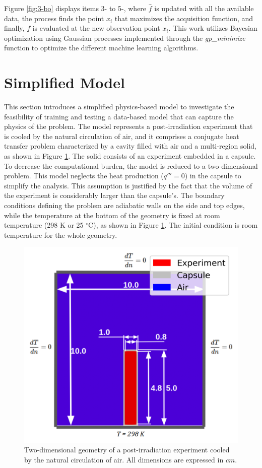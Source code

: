 Figure \ref{fig:3-bo} displays items 3- to 5-, where $\hat{f}$ is updated with all the available data, the process finds the point $x_i$ that maximizes the acquisition function, and finally, $f$ is evaluated at the new observation point $x_i$. 
This work utilizes Bayesian optimization using Gaussian processes implemented through the \textit{gp\_minimize} function \cite{scikit_optimize} to optimize the different machine learning algorithms.


\section{Simplified Model}
\label{sec:simpl-model}

This section introduces a simplified physics-based model to investigate the feasibility of training and testing a data-based model that can capture the physics of the problem.
The model represents a post-irradiation experiment that is cooled by the natural circulation of air, and it comprises a conjugate heat transfer problem characterized by a cavity filled with air and a multi-region solid, as shown in Figure \ref{fig:tf-geo}.
The solid consists of an experiment embedded in a capsule.
To decrease the computational burden, the model is reduced to a two-dimensional problem.
This model neglects the heat production ($q''' = 0$) in the capsule to simplify the analysis.
This assumption is justified by the fact that the volume of the experiment is considerably larger than the capsule's.
The boundary conditions defining the problem are adiabatic walls on the side and top edges, while the temperature at the bottom of the geometry is fixed at room temperature (298 K or 25 $^\circ$C), as shown in Figure \ref{fig:tf-geo}.
The initial condition is room temperature for the whole geometry.

\begin{figure}[htbp!] %
    \centering
    \includegraphics[width=0.5\linewidth]{figures/tf-geo-simple2}
    \hfill
    \caption{Two-dimensional geometry of a post-irradiation experiment cooled by the natural circulation of air. All dimensions are expressed in $cm$.}
    \label{fig:tf-geo}
\end{figure}

